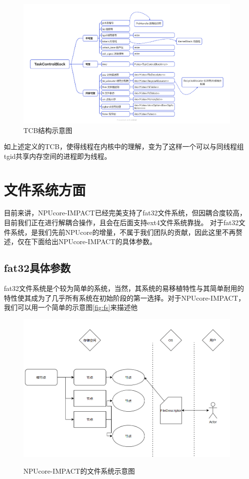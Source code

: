 \begin{figure}[h]
    \centering
    \includegraphics[width=1\linewidth]{figs/TCBBlock.png}
    \caption{TCB结构示意图}
    \label{TCB结构示意图}
\end{figure}

如上述定义的TCB，使得线程在内核中的理解，变为了这样一个可以与同线程组tgid共享内存空间的进程即为线程。

\section{文件系统方面}

目前来讲，NPUcore-IMPACT已经完美支持了fat32文件系统，但因耦合度较高，目前我们正在进行解耦合操作，且会在后面支持ext4文件系统靠拢。
对于fat32文件系统，是我们先前NPUcore的增量，不属于我们团队的贡献，因此这里不再赘述，仅在下面给出NPUcore-IMPACT的具体参数。

\subsection{fat32具体参数}

fat32文件系统是个较为简单的系统，当然，其系统的易移植特性与其简单耐用的特性使其成为了几乎所有系统在初始阶段的第一选择。对于NPUcore-IMPACT，我们可以用一个简单的示意图\autoref{fig:fs}来描述他

\begin{figure}[htb]
    \centering
    \includegraphics[width=1\linewidth]{figs/dirt.PNG}
    \label{fig:fs}
    \caption{NPUcore-IMPACT的文件系统示意图}
\end{figure}

